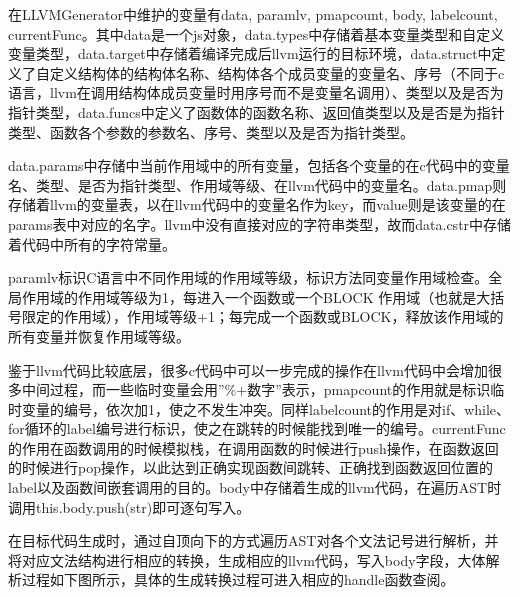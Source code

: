 \documentclass[a4paper]{article}
\begin{document}
\begin{CJK*}{UTF8}{gbsn}
    在LLVMGenerator中维护的变量有data, paramlv, pmapcount, body, labelcount, currentFunc。其中data是一个js对象，data.types中存储着基本变量类型和自定义变量类型，data.target中存储着编译完成后llvm运行的目标环境，data.struct中定义了自定义结构体的结构体名称、结构体各个成员变量的变量名、序号（不同于c语言，llvm在调用结构体成员变量时用序号而不是变量名调用）、类型以及是否为指针类型，data.funcs中定义了函数体的函数名称、返回值类型以及是否是为指针类型、函数各个参数的参数名、序号、类型以及是否为指针类型。
	\par data.params中存储中当前作用域中的所有变量，包括各个变量的在c代码中的变量名、类型、是否为指针类型、作用域等级、在llvm代码中的变量名。data.pmap则存储着llvm的变量表，以在llvm代码中的变量名作为key，而value则是该变量的在params表中对应的名字。llvm中没有直接对应的字符串类型，故而data.cstr中存储着代码中所有的字符常量。

	\par paramlv标识C语言中不同作用域的作用域等级，标识方法同变量作用域检查。全局作用域的作用域等级为1，每进入一个函数或一个BLOCK 作用域（也就是大括号限定的作用域），作用域等级+1；每完成一个函数或BLOCK，释放该作用域的所有变量并恢复作用域等级。
	\par 鉴于llvm代码比较底层，很多c代码中可以一步完成的操作在llvm代码中会增加很多中间过程，而一些临时变量会用”\%+数字”表示，pmapcount的作用就是标识临时变量的编号，依次加1，使之不发生冲突。同样labelcount的作用是对if、while、for循环的label编号进行标识，使之在跳转的时候能找到唯一的编号。currentFunc的作用在函数调用的时候模拟栈，在调用函数的时候进行push操作，在函数返回的时候进行pop操作，以此达到正确实现函数间跳转、正确找到函数返回位置的label以及函数间嵌套调用的目的。body中存储着生成的llvm代码，在遍历AST时调用this.body.push(str)即可逐句写入。
	\par 在目标代码生成时，通过自顶向下的方式遍历AST对各个文法记号进行解析，并将对应文法结构进行相应的转换，生成相应的llvm代码，写入body字段，大体解析过程如下图所示，具体的生成转换过程可进入相应的handle函数查阅。


\end{CJK*}
\end{document}
